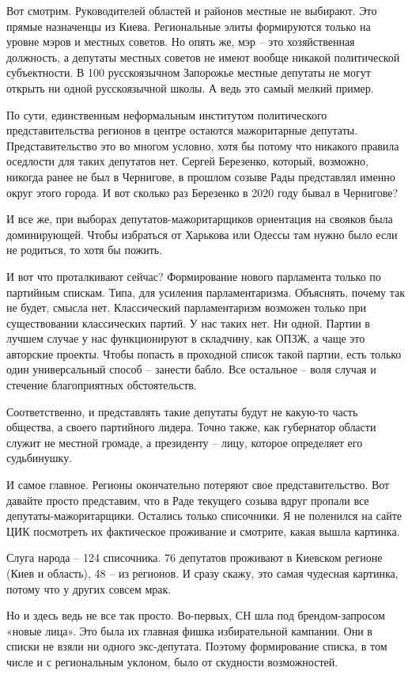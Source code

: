Вот смотрим. Руководителей областей и районов местные не выбирают. Это прямые
назначенцы из Киева. Региональные элиты формируются только на уровне мэров и
местных советов. Но опять же, мэр – это хозяйственная должность, а депутаты
местных советов не имеют вообще никакой политической субъектности. В 100%
русскоязычном Запорожье местные депутаты не могут открыть ни одной
русскоязычной школы. А ведь это самый мелкий пример.

По сути, единственным неформальным институтом политического представительства
регионов в центре остаются мажоритарные депутаты. Представительство это во
многом условно, хотя бы потому что никакого правила оседлости для таких
депутатов нет. Сергей Березенко, который, возможно, никогда ранее не был в
Чернигове, в прошлом созыве Рады представлял именно округ этого города. И вот
сколько раз Березенко в 2020 году бывал в Чернигове?

И все же, при выборах депутатов-мажоритарщиков ориентация на свояков была
доминирующей. Чтобы избраться от Харькова или Одессы там нужно было если не
родиться, то хотя бы пожить.

И вот что проталкивают сейчас? Формирование нового парламента только по
партийным спискам. Типа, для усиления парламентаризма. Объяснять, почему так не
будет, смысла нет. Классический парламентаризм возможен только при
существовании классических партий. У нас таких нет. Ни одной. Партии в лучшем
случае у нас функционируют в складчину, как ОПЗЖ, а чаще это авторские проекты.
Чтобы попасть в проходной список такой партии, есть только один универсальный
способ – занести бабло. Все остальное – воля случая и стечение благоприятных
обстоятельств.

Соответственно, и представлять такие депутаты будут не какую-то часть общества,
а своего партийного лидера. Точно также, как губернатор области служит не
местной громаде, а президенту – лицу, которое определяет его судьбинушку.

И самое главное. Регионы окончательно потеряют свое представительство. Вот
давайте просто представим, что в Раде текущего созыва вдруг пропали все
депутаты-мажоритарщики. Остались только списочники. Я не поленился на сайте ЦИК
посмотреть их фактическое проживание и смотрите, какая вышла картинка.

Слуга народа – 124 списочника. 76 депутатов проживают в Киевском регионе (Киев
и область), 48 – из регионов. И сразу скажу, это самая чудесная картинка,
потому что у других совсем мрак.

Но и здесь ведь не все так просто. Во-первых, СН шла под брендом-запросом
«новые лица». Это была их главная фишка избирательной кампании. Они в списки не
взяли ни одного экс-депутата. Поэтому формирование списка, в том числе и с
региональным уклоном, было от скудности возможностей.

